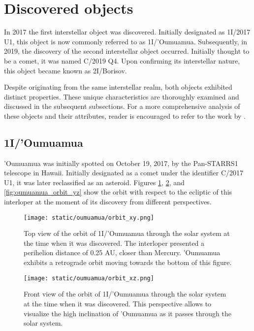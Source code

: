\section{Discovered objects}

In 2017 the first interstellar object was discovered. Initially designated as
1I/2017 U1, this object is now commonly referred to as 1I/'Oumuamua.
Subsequently, in 2019, the discovery of the second interstellar object occurred.
Initially thought to be a comet, it was named C/2019 Q4. Upon confirming its
interstellar nature, this object became known as 2I/Borisov.

Despite originating from the same interstellar realm, both objects exhibited
distinct properties. These unique characteristics are thoroughly examined and
discussed in the subsequent subsections. For a more comprehensive analysis of
these objects and their attributes, reader is encouraged to refer to the work
by \cite{jewitt2022}.

\subsection{1I/'Oumuamua}

'Oumuamua was initially spotted on October 19, 2017, by the Pan-STARRS1
telescope in Hawaii. Initially designated as a comet under the identifier C/2017
U1, it was later reclassified as an asteroid. Figures \ref{fig:oumuamua_orbit},
\ref{fig:oumuamua_orbit_xz}, and \ref{fig:oumuamua_orbit_yz} show the orbit with
respect to the ecliptic of this interloper at the moment of its discovery from
different perspectives.

\begin{figure}[H]
  \centering
  \texttt{[image: static/oumuamua/orbit\_xy.png]}
  \caption[Top view of the orbit of 1I/'Oumuamua through the solar system]{
    Top view of the orbit of 1I/'Oumuamua through the solar system at the time when it was
    discovered. The interloper presented a perihelion distance of 0.25 AU,
    closer than Mercury. 'Oumuamua exhibits a retrograde orbit moving
    towards the bottom of this figure.
  }
  \label{fig:oumuamua_orbit}
\end{figure}

\begin{figure}[H]
  \centering
  \texttt{[image: static/oumuamua/orbit\_xz.png]}
  \caption[Front view of the orbit of 1I/'Oumuamua through the solar system]{
    Front view of the orbit of 1I/'Oumuamua through the solar system at the time when it was
    discovered. This perspective allows to visualize the high inclination of
    'Oumuamua as it passes through the solar system.}
  \label{fig:oumuamua_orbit_xz}
\end{figure}

